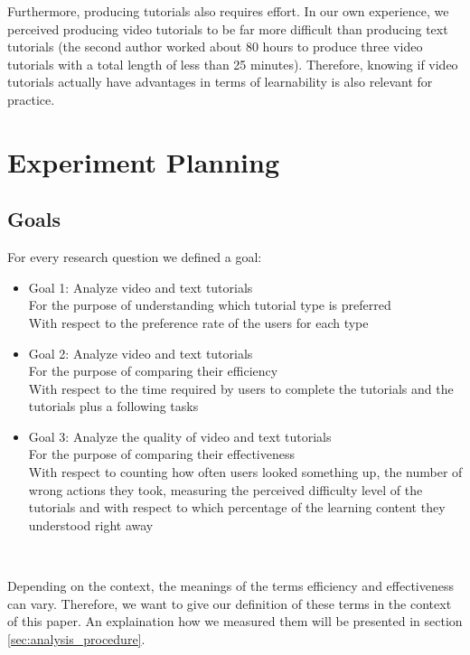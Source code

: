 Furthermore, producing tutorials also requires effort. In our own experience, we perceived producing video tutorials to be far more difficult than producing text tutorials (the second author worked about 80 hours to produce three video tutorials with a total length of less than 25 minutes). Therefore, knowing if video tutorials actually have advantages in terms of learnability is also relevant for practice.




\section{Experiment Planning}


\subsection{Goals} 
For every research question we defined a goal:
\begin{itemize}
	\item Goal 1: Analyze video and text tutorials \\
	For the purpose of understanding which tutorial type is preferred\\
	With respect to the preference rate of the users for each type
	\item Goal 2: Analyze video and text tutorials\\
	For the purpose of comparing their efficiency\\
	With respect to the time required by users to complete the tutorials and the tutorials plus a following  tasks
	\item Goal 3: Analyze the quality of video and text tutorials\\
	For the purpose of comparing their effectiveness\\
	With respect to counting how often users looked something up, the number of wrong actions they took, measuring the perceived difficulty level of the tutorials and with respect to which percentage of the learning content they understood right away	
\end{itemize}



~

Depending on the context, the meanings of the terms efficiency and effectiveness can vary. Therefore, we want to give our definition of these terms in the context of this paper. An explaination how we measured them will be presented in section \ref{sec:analysis_procedure}.

